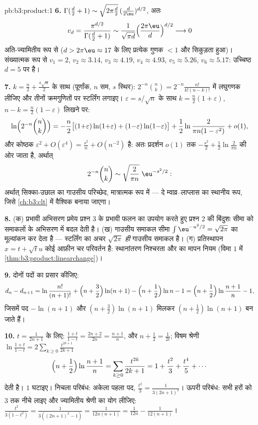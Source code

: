 \begin{solution}{pb:b3:product:1}
\textbf{6.} $\Gamma(\frac d2 + 1) \sim \sqrt{2\pi\frac
d2}\,(\frac d{2\eu})^{d/2}$, अतः
\[
v_d = \frac{\pi^{d/2}}{\Gamma(\frac d2 + 1)}
\sim \frac{1}{\sqrt{\pi d}}\Bigl(\frac{2\pi\eu}
d\Bigr)^{d/2} \longrightarrow 0
\]
अति-ज्यामितीय रूप से ($d > 2\pi\eu \approx 17$ के लिए प्रत्येक गुणक $< 1$ और सिकुड़ता
हुआ)। संख्यात्मक रूप से $v_1 = 2$, $v_2 \approx
3.14$, $v_3 \approx 4.19$, $v_4 \approx 4.93$, $v_5 \approx
5.26$, $v_6 \approx 5.17$:
उच्चिष्ठ $d = 5$ पर है।

\textbf{7.} $k = \frac n2 + \frac{s\sqrt n}2$ के साथ (पूर्णांक, $n$ सम, $s$ स्थिर): $2^{-n}\binom nk =
2^{-n}\frac{n!}{k!(n-k)!}$
में लघुगणक लीजिए और तीनों क्रमगुणितों पर स्टर्लिंग लगाइए। $\varepsilon = s/\sqrt n$ के
साथ $k = \frac n2(1 + \varepsilon)$, $n - k =
\frac n2(1 - \varepsilon)$ लिखने पर:
\[
\ln\Bigl(2^{-n}\binom nk\Bigr)
= -\frac n2\bigl[(1{+}\varepsilon)\ln(1{+}\varepsilon) +
(1{-}\varepsilon)\ln(1{-}\varepsilon)\bigr]
+ \frac12\ln\frac{2}{\pi n(1 - \varepsilon^2)} + o(1),
\]
और कोष्ठक $\varepsilon^2 + O(\varepsilon^4) =
\frac{s^2}n + O(n^{-2})$ है: अतः प्रदर्शन $o(1)$ तक $-\frac{s^2}2 +
\frac12\ln\frac2{\pi n}$ की ओर जाता है, अर्थात्
\[
2^{-n}\binom nk \sim \sqrt{\frac{2}{\pi
n}}\;\eu^{-s^2/2} :
\]
अर्थात् सिक्का-उछाल का गाउसीय परिच्छेद, मात्रात्मक रूप में ---
दे म्वाव्र--लाप्लास का स्थानीय रूप, जिसे \cref{ch:b3:clt} में वैश्विक बनाया
जाएगा।

\textbf{8.} (क) प्रभावी अभिसरण प्रमेय प्रश्न 3 के प्रभावी फलन का
उपयोग करते हुए प्रश्न 2 की बिंदुशः सीमा को समाकलों के अभिसरण में
बदल देती है। (ख) गाउसीय समाकल सीमा $\int\eu^{-u^2/2} = \sqrt{2\pi}$ का मूल्यांकन कर देता है
--- स्टर्लिंग का अचर $\sqrt{2\pi}$ \emph{ही} गाउसीय समाकल है। (ग) प्रतिस्थापन
$x = t + \sqrt tu$ कोई आफ़ीन चर परिवर्तन है: स्थानांतरण निश्चरता और  का
मापन नियम (विमा $1$ में \cref{thm:b3:product:linearchange})।

\textbf{9.} दोनों पदों का प्रसार कीजिए:
\[
d_n - d_{n+1} = \ln\frac{n!}{(n+1)!} + \Bigl(n +
\frac32\Bigr)\ln(n+1) - \Bigl(n + \frac12\Bigr)\ln n - 1
= \Bigl(n + \frac12\Bigr)\ln\frac{n+1}n - 1,
\]
जिसमें पद $-\ln(n+1)$ और $(n + \frac32)\ln(n+1)$ मिलकर $(n + \frac12)\ln(n+1)$ बन जाते हैं।

\textbf{10.} $t = \frac1{2n+1}$ के लिए: $\frac{1+t}{1-t} =
\frac{2n+2}{2n} = \frac{n+1}n$, और $n + \frac12 =
\frac1{2t}$; विषम श्रेणी $\ln\frac{1+t}{1-t} =
2\sum_{k\geq0}\frac{t^{2k+1}}{2k+1}$
\[
\Bigl(n + \frac12\Bigr)\ln\frac{n+1}n
= \sum_{k\geq0}\frac{t^{2k}}{2k+1}
= 1 + \frac{t^2}3 + \frac{t^4}5 + \cdots
\]
देती है। $1$ घटाइए। निचला परिबंध: अकेला पहला पद, $\frac{t^2}3 = \frac1{3(2n+1)^2}$। ऊपरी
परिबंध: सभी हरों को $3$ तक नीचे लाइए और ज्यामितीय श्रेणी का योग
लीजिए: $\frac{t^2}{3(1 - t^2)} = \frac1{3((2n+1)^2 - 1)} =
\frac1{12n(n+1)} = \frac1{12n} - \frac1{12(n+1)}$।


\end{solution}
